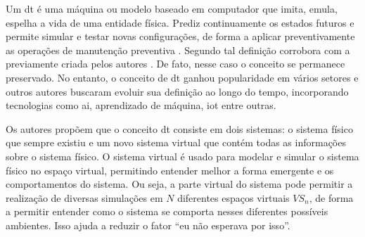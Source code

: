 Um \acrfull{dt} é uma máquina ou modelo baseado em computador que imita, emula, espelha a vida de uma entidade física. Prediz continuamente os estados futuros e permite simular e testar novas configurações, de forma a aplicar preventivamente as operações de manutenção preventiva \cite{Barricelli2019}. Segundo  \textcite{Mihai2022} tal definição corrobora com a previamente criada pelos autores \textcite{Grieves2017}.  De fato, nesse caso o conceito se permanece preservado. No entanto, o conceito de \acrshort{dt} ganhou popularidade em vários setores e outros autores buscaram evoluir sua definição ao longo do tempo, incorporando tecnologias como \acrshort{ai}, aprendizado de máquina,  \acrshort{iot}  entre outras. 

Os autores \textcite{Grieves2017} propõem que o conceito \acrfull{dt} consiste em dois sistemas: o sistema físico que sempre existiu e um novo sistema virtual que contém todas as informações sobre o sistema físico. O sistema virtual é usado para modelar e simular o sistema físico no espaço virtual, permitindo entender melhor a forma emergente e os comportamentos do sistema. Ou seja, a parte virtual do sistema pode permitir a realização de diversas simulações em $N$ diferentes espaços virtuais $VS_n$, de forma a permitir entender como o sistema se comporta nesses diferentes possíveis ambientes. Isso ajuda a reduzir o fator “eu não esperava por isso”.

